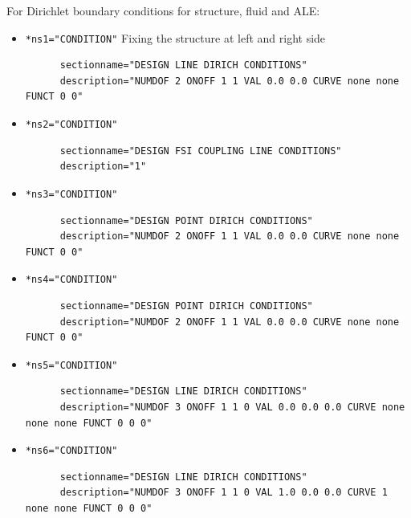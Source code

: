 For Dirichlet boundary conditions for structure, fluid and ALE:

\begin{itemize}

  \item \verb|*ns1="CONDITION"| \qquad Fixing the structure at left and right
  side
  \begin{small} \begin{verbatim}
      sectionname="DESIGN LINE DIRICH CONDITIONS"
      description="NUMDOF 2 ONOFF 1 1 VAL 0.0 0.0 CURVE none none FUNCT 0 0"
    \end{verbatim} 
  \end{small}
  
  \item \verb|*ns2="CONDITION"| \qquad
  \begin{small} \begin{verbatim}
      sectionname="DESIGN FSI COUPLING LINE CONDITIONS"
      description="1"
    \end{verbatim}
   \end{small}
   
  \item \verb|*ns3="CONDITION"| \qquad
  \begin{small} \begin{verbatim}
      sectionname="DESIGN POINT DIRICH CONDITIONS"
      description="NUMDOF 2 ONOFF 1 1 VAL 0.0 0.0 CURVE none none FUNCT 0 0"
    \end{verbatim}
   \end{small}
   
  \item \verb|*ns4="CONDITION"| \qquad
  \begin{small} \begin{verbatim}
      sectionname="DESIGN POINT DIRICH CONDITIONS"
      description="NUMDOF 2 ONOFF 1 1 VAL 0.0 0.0 CURVE none none FUNCT 0 0"
    \end{verbatim}
   \end{small}
   
  \item \verb|*ns5="CONDITION"| \qquad
  \begin{small} \begin{verbatim}
      sectionname="DESIGN LINE DIRICH CONDITIONS"
      description="NUMDOF 3 ONOFF 1 1 0 VAL 0.0 0.0 0.0 CURVE none none none FUNCT 0 0 0"
    \end{verbatim}
   \end{small}
   
  \item \verb|*ns6="CONDITION"| \qquad
  \begin{small} \begin{verbatim}
      sectionname="DESIGN LINE DIRICH CONDITIONS"
      description="NUMDOF 3 ONOFF 1 1 0 VAL 1.0 0.0 0.0 CURVE 1 none none FUNCT 0 0 0"
    \end{verbatim}
   \end{small}
   

\end{itemize}
